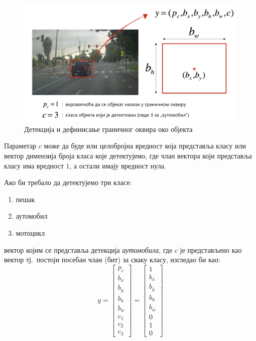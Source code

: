 \documentclass[12pt, а4paper]{article}
\begin{document}
\begin{figure}[H]
  \centering
      \includegraphics[scale=0.35]{slike/box_label.png}
  \caption{Детекција и дефинисање граничног оквира око објекта}
  \label{fig:bb_auto}
\end{figure}

Параметар $c$ може да буде или целобројна вредност која представља класу или
вектор димензија броја класа које детектујемо, где члан вектора који
представља класу има вредност $1$, а остали имају вредност нула.

Ако би требало да детектујемо три класе:
\begin{enumerate}
 \item пешак
 \item аутомобил
 \item мотоцикл
\end{enumerate}
вектор којим се представља детекција \textit{аутомобила}, где $c$ је
представљено као вектор тј.\ постоји посебан члан (бит) за
сваку класу, изгледао би као:
\begin{equation}
y =
\begin{bmatrix}
 p_c \\
 b_x \\
 b_y \\
 b_h \\
 b_w \\
 c_1 \\
 c_2 \\
 c_3
\end{bmatrix}
=
\begin{bmatrix}
 1 \\
 b_x \\
 b_y \\
 b_h \\
 b_w \\
 0 \\
 1 \\
 0
\end{bmatrix}
\label{eq:detResKl}
\end{equation}
\end{document}
